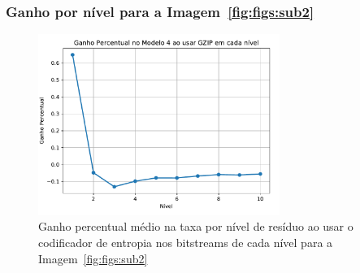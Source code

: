 \documentclass{beamer}
\begin{document}
\begin{frame}
\frametitle{Ganho por nível para a Imagem~\ref{fig:figs:sub2}}
\begin{figure}
    \centering
    \includegraphics[width=0.7\textwidth]{figs/gain_gzip_kodim05.pdf}
    \caption{Ganho percentual médio na taxa por nível de resíduo ao usar o codificador de entropia nos bitstreams de cada nível para a Imagem~\ref{fig:figs:sub2}}
\end{figure}
\end{frame}
\end{document}
